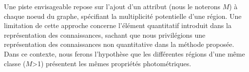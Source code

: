  
	Une piste envisageable repose sur l'ajout d'un attribut (nous le noterons $M$) à chaque noeud du graphe, spécifiant la multiplicité potentielle d'une région. Une limitation de cette approche concerne l'élément quantitatif introduit dans la représentation des connaissances, sachant que nous privilégions une représentation des connaissances non quantitative dans la méthode proposée. Dans ce contexte, nous ferons l'hypothèse que les différentes régions d'une même classe ($M$>1) présentent les mêmes propriétés photométriques.\\






